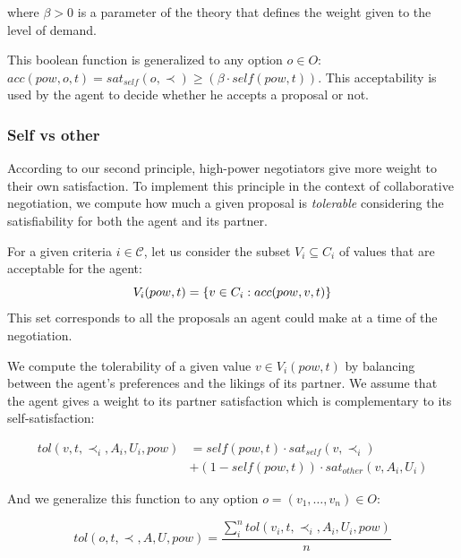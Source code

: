 \documentclass{llncs}
\begin{document}
		\medskip
		where $\beta>0$ is a parameter of the theory that defines the weight given to the level of demand.
		
		This boolean function is generalized to any option $o \in O$: $acc(pow,o, t) = sat_{self}(o, \prec) \geq  (\beta \cdot self(pow,t))$. This acceptability is used by the agent to decide whether he accepts a proposal or not.
		
		
		\subsubsection {Self vs other}
		According to our second principle, high-power negotiators give more weight to their own satisfaction. To implement this principle in the context of collaborative negotiation, we compute how much a given proposal is \emph{tolerable} considering the satisfiability for both the agent and its partner.
		
		For a given criteria $i\in\mathcal{C}$, let us consider the subset $V_i\subseteq C_i$ of values that are acceptable for the agent:
		\vspace{-0.5em} 
		\begin{equation}
		V_i(pow,t) = \{ v\in C_i : acc(pow,v,t) \}
		\vspace{-0.5em}
		\end{equation}
		This set corresponds to all the proposals an agent could make at a time of the negotiation.
		
		We compute the tolerability of a given value $v\in V_i(pow,t)$ by balancing between the agent's preferences and the likings of its partner. We assume that the agent gives a weight to its partner satisfaction which is complementary to its self-satisfaction:
		
		\begin{equation}
		\begin{split}
		tol(v, t, \prec_i, A_i, U_i, pow) & = self(pow, t)  \cdot sat_{self}(v, \prec_i) \\
		& +  (1 - self(pow, t)) \cdot sat_{other}(v, A_i, U_i)
		\end{split} 
		\end{equation}
		
		\noindent
		And we generalize this function to any option $o=(v_1,\ldots,v_n) \in O$:
		
		\begin{equation}
		tol(o, t, \prec, A, U, pow) = \frac{ \sum_{i}^{n} tol(v_i, t, \prec_i, A_i, U_i, pow) } {n}
		\end{equation}
		
\end{document}
